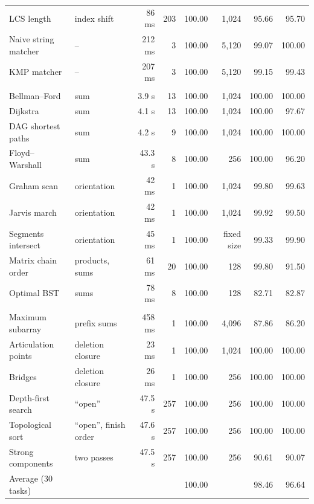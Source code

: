 \documentclass[10pt]{article}
\begin{document}
\begin{table}[tbp]
\begin{tabular}{llrrrrrr}
LCS length & index shift & 86 ms & 203 & 100.00 & 1,024 & 95.66 & 95.70 \\
Naive string matcher & -- & 212 ms & 3 & 100.00 & 5,120 & 99.07 & 100.00 \\
KMP matcher & -- & 207 ms & 3 & 100.00 & 5,120 & 99.15 & 99.43 \\
\addlinespace[2pt]
\multicolumn{8}{l}{\textit{One arithmetic primitive supplied}} \\
Bellman--Ford & sum & 3.9 s & 13 & 100.00 & 1,024 & 100.00 & 100.00 \\
Dijkstra & sum & 4.1 s & 13 & 100.00 & 1,024 & 100.00 & 97.67 \\
DAG shortest paths & sum & 4.2 s & 9 & 100.00 & 1,024 & 100.00 & 100.00 \\
Floyd--Warshall & sum & 43.3 s & 8 & 100.00 & 256 & 100.00 & 96.20 \\
Graham scan & orientation & 42 ms & 1 & 100.00 & 1,024 & 99.80 & 99.63 \\
Jarvis march & orientation & 42 ms & 1 & 100.00 & 1,024 & 99.92 & 99.50 \\
Segments intersect & orientation & 45 ms & 1 & 100.00 & fixed size & 99.33 & 99.90 \\
Matrix chain order & products, sums & 61 ms & 20 & 100.00 & 128 & 99.80 & 91.50 \\
Optimal BST & sums & 78 ms & 8 & 100.00 & 128 & 82.71 & 82.87 \\
\addlinespace[2pt]
\multicolumn{8}{l}{\textit{Algorithmic structure supplied}} \\
Maximum subarray & prefix sums & 458 ms & 1 & 100.00 & 4,096 & 87.86 & 86.20 \\
Articulation points & deletion closure & 23 ms & 1 & 100.00 & 1,024 & 100.00 & 100.00 \\
Bridges & deletion closure & 26 ms & 1 & 100.00 & 256 & 100.00 & 100.00 \\
Depth-first search & ``open'' & 47.5 s & 257 & 100.00 & 256 & 100.00 & 100.00 \\
Topological sort & ``open'', finish order & 47.6 s & 257 & 100.00 & 256 & 100.00 & 100.00 \\
Strong components & two passes & 47.5 s & 257 & 100.00 & 256 & 90.61 & 90.07 \\
\midrule
Average (30 tasks) & & & & 100.00 & & 98.46 & 96.64 \\
\bottomrule\end{tabular}
\end{table}
\end{document}
